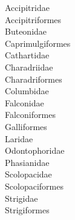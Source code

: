 
\begin{multicols}{3}
\noindent Accipitridae \\
Accipitriformes \\
Buteonidae \\
Caprimulgiformes \\
Cathartidae \\
Charadriidae \\
Charadriformes \\
Columbidae \\
Falconidae \\
Falconiformes \\
Galliformes \\
Laridae \\
Odontophoridae \\
Phasianidae \\
Scolopacidae \\
Scolopaciformes \\
Strigidae \\ 
Strigiformes
\end{multicols}
